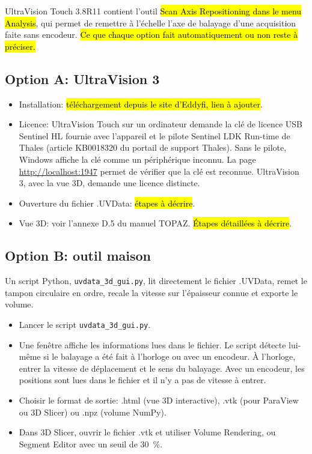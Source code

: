 \documentclass[11pt,letterpaper]{article}
\begin{document}
UltraVision Touch 3.8R11 contient l'outil \hl{Scan Axis Repositioning dans le menu Analysis}, qui permet de remettre \`a l'\'echelle l'axe de balayage d'une acquisition faite sans encodeur. \hl{Ce que chaque option fait automatiquement ou non reste à préciser.}

\subsection{Option A: UltraVision 3}

\begin{itemize}
  \item Installation: \hl{téléchargement depuis le site d'Eddyfi, lien à ajouter}.
  \item Licence: UltraVision Touch sur un ordinateur demande la cl\'e de licence USB Sentinel HL fournie avec l'appareil et le pilote Sentinel LDK Run-time de Thales (article KB0018320 du portail de support Thales). Sans le pilote, Windows affiche la cl\'e comme un p\'eriph\'erique inconnu. La page \url{http://localhost:1947} permet de v\'erifier que la cl\'e est reconnue. UltraVision 3, avec la vue 3D, demande une licence distincte.
  \item Ouverture du fichier .UVData: \hl{étapes à décrire}.
  \item Vue 3D: voir l'annexe D.5 du manuel TOPAZ. \hl{Étapes détaillées à décrire}.
\end{itemize}


\subsection{Option B: outil maison}

Un script Python, \texttt{uvdata\_3d\_gui.py}, lit directement le fichier .UVData, remet le tampon circulaire en ordre, recale la vitesse sur l'\'epaisseur connue et exporte le volume.

\begin{itemize}
  \item Lancer le script \texttt{uvdata\_3d\_gui.py}.
  \item Une fen\^etre affiche les informations lues dans le fichier. Le script d\'etecte lui-m\^eme si le balayage a \'et\'e fait \`a l'horloge ou avec un encodeur. \`A l'horloge, entrer la vitesse de d\'eplacement et le sens du balayage. Avec un encodeur, les positions sont lues dans le fichier et il n'y a pas de vitesse \`a entrer.
  \item Choisir le format de sortie: .html (vue 3D interactive), .vtk (pour ParaView ou 3D Slicer) ou .npz (volume NumPy).
  \item Dans 3D Slicer, ouvrir le fichier .vtk et utiliser Volume Rendering, ou Segment Editor avec un seuil de 30~\%.
\end{itemize}
\end{document}
